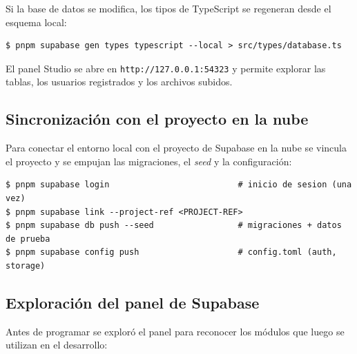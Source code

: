 Si la base de datos se modifica, los tipos de TypeScript se regeneran
desde el esquema local:

\begin{lstlisting}[style=terminal]
$ pnpm supabase gen types typescript --local > src/types/database.ts
\end{lstlisting}

El panel Studio se abre en \texttt{http://127.0.0.1:54323} y permite
explorar las tablas, los usuarios registrados y los archivos subidos.

\subsection{Sincronizaci\'on con el proyecto en la nube}

Para conectar el entorno local con el proyecto de Supabase en la nube se
vincula el proyecto y se empujan las migraciones, el \textit{seed} y la
configuraci\'on:

\begin{lstlisting}[style=terminal]
$ pnpm supabase login                          # inicio de sesion (una vez)
$ pnpm supabase link --project-ref <PROJECT-REF>
$ pnpm supabase db push --seed                 # migraciones + datos de prueba
$ pnpm supabase config push                    # config.toml (auth, storage)
\end{lstlisting}

\subsection{Exploraci\'on del panel de Supabase}

Antes de programar se explor\'o el panel para reconocer los m\'odulos que
luego se utilizan en el desarrollo:

